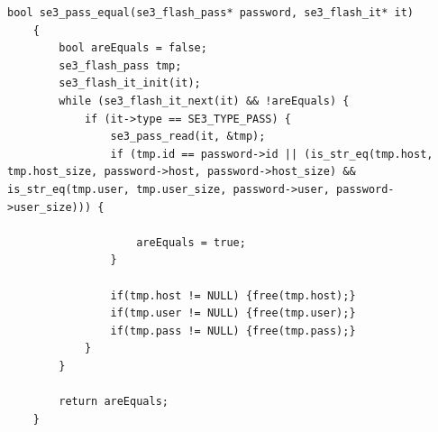 \begin{lstlisting}[style=CStyle,caption="Code for searching if password record is already present", label=code_sepass_equal,breaklines=true]
	bool se3_pass_equal(se3_flash_pass* password, se3_flash_it* it)
	{
		bool areEquals = false;
		se3_flash_pass tmp;
		se3_flash_it_init(it);
		while (se3_flash_it_next(it) && !areEquals) {
			if (it->type == SE3_TYPE_PASS) {
				se3_pass_read(it, &tmp);
				if (tmp.id == password->id || (is_str_eq(tmp.host, tmp.host_size, password->host, password->host_size) && is_str_eq(tmp.user, tmp.user_size, password->user, password->user_size))) {
					
					areEquals = true;
				}
				
				if(tmp.host != NULL) {free(tmp.host);}
				if(tmp.user != NULL) {free(tmp.user);}
				if(tmp.pass != NULL) {free(tmp.pass);}
			}
		}
		
		return areEquals;
	}
\end{lstlisting}



